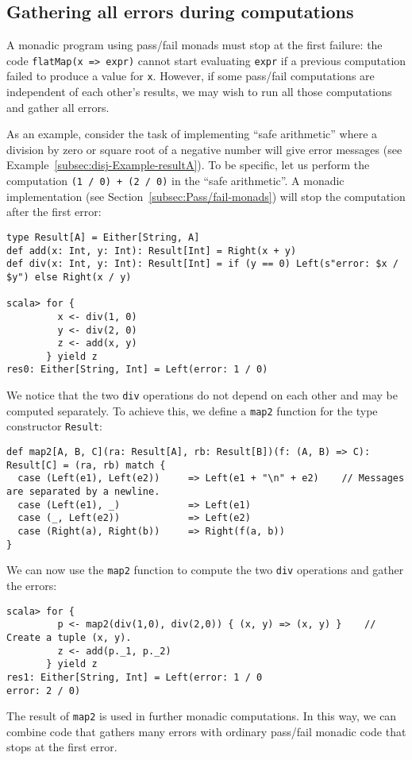 \subsection{Gathering all errors during computations\label{subsec:Programs-that-accumulate-errors}}

A monadic program using pass/fail monads must stop at the first failure:
the code \lstinline!flatMap(x => expr)! cannot start evaluating \lstinline!expr!
if a previous computation failed to produce a value for \lstinline!x!.
However, if some pass/fail computations are independent of each other\textsf{'}s
results, we may wish to run all those computations and gather all
errors.

As an example, consider the task of implementing \textsf{``}safe arithmetic\textsf{''}
where a division by zero or square root of a negative number will
give error messages (see Example~\ref{subsec:disj-Example-resultA}).
To be specific, let us perform the computation \lstinline!(1 / 0) + (2 / 0)!
in the \textsf{``}safe arithmetic\textsf{''}. A monadic implementation (see Section~\ref{subsec:Pass/fail-monads})
will stop the computation after the first error:
\begin{lstlisting}
type Result[A] = Either[String, A]
def add(x: Int, y: Int): Result[Int] = Right(x + y)
def div(x: Int, y: Int): Result[Int] = if (y == 0) Left(s"error: $x / $y") else Right(x / y)

scala> for {
         x <- div(1, 0)
         y <- div(2, 0)
         z <- add(x, y)
       } yield z
res0: Either[String, Int] = Left(error: 1 / 0)
\end{lstlisting}
We notice that the two \lstinline!div! operations do not depend on
each other and may be computed separately. To achieve this, we define
a \lstinline!map2! function for the type constructor \lstinline!Result!:
\begin{lstlisting}
def map2[A, B, C](ra: Result[A], rb: Result[B])(f: (A, B) => C): Result[C] = (ra, rb) match {
  case (Left(e1), Left(e2))     => Left(e1 + "\n" + e2)    // Messages are separated by a newline.
  case (Left(e1), _)            => Left(e1)
  case (_, Left(e2))            => Left(e2)
  case (Right(a), Right(b))     => Right(f(a, b))
}
\end{lstlisting}
 We can now use the \lstinline!map2! function to compute the two
\lstinline!div! operations and gather the errors:
\begin{lstlisting}
scala> for {
         p <- map2(div(1,0), div(2,0)) { (x, y) => (x, y) }    // Create a tuple (x, y).
         z <- add(p._1, p._2)
       } yield z
res1: Either[String, Int] = Left(error: 1 / 0
error: 2 / 0)
\end{lstlisting}
The result of \lstinline!map2! is used in further monadic computations.
In this way, we can combine code that gathers many errors with ordinary
pass/fail monadic code that stops at the first error.

